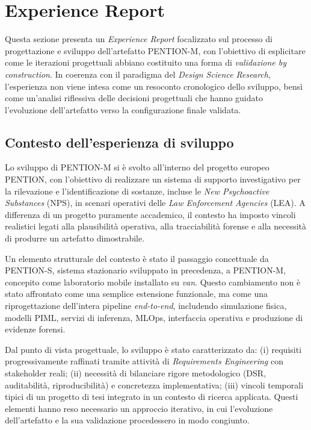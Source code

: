 \section{Experience Report}
\label{sec:experience_report}

Questa sezione presenta un \emph{Experience Report} focalizzato sul processo di progettazione e sviluppo dell’artefatto \textsc{PENTION-M}, con l’obiettivo di esplicitare come le iterazioni progettuali abbiano costituito una forma di \emph{validazione by construction}. In coerenza con il paradigma del \emph{Design Science Research}, l’esperienza non viene intesa come un resoconto cronologico dello sviluppo, bensì come un’analisi riflessiva delle decisioni progettuali che hanno guidato l’evoluzione dell’artefatto verso la configurazione finale validata.

\subsection{Contesto dell’esperienza di sviluppo}
\label{sec:exp_context}

Lo sviluppo di \textsc{PENTION-M} si è svolto all’interno del progetto europeo PENTION, con l’obiettivo di realizzare un sistema di supporto investigativo per la rilevazione e l’identificazione di sostanze, incluse le \emph{New Psychoactive Substances} (NPS), in scenari operativi delle \emph{Law Enforcement Agencies} (LEA).
A differenza di un progetto puramente accademico, il contesto ha imposto vincoli realistici legati alla plausibilità operativa, alla tracciabilità forense e alla necessità di produrre un artefatto dimostrabile.

Un elemento strutturale del contesto è stato il passaggio concettuale da \textsc{PENTION-S}, sistema stazionario sviluppato in precedenza, a \textsc{PENTION-M}, concepito come laboratorio mobile installato su \textit{van}.
Questo cambiamento non è stato affrontato come una semplice estensione funzionale, ma come una riprogettazione dell’intera pipeline \textit{end-to-end}, includendo simulazione fisica, modelli PIML, servizi di inferenza, MLOps, interfaccia operativa e produzione di evidenze forensi.

Dal punto di vista progettuale, lo sviluppo è stato caratterizzato da:
(i) requisiti progressivamente raffinati tramite attività di \emph{Requirements Engineering} con stakeholder reali;
(ii) necessità di bilanciare rigore metodologico (DSR, auditabilità, riproducibilità) e concretezza implementativa;
(iii) vincoli temporali tipici di un progetto di tesi integrato in un contesto di ricerca applicata.
Questi elementi hanno reso necessario un approccio iterativo, in cui l’evoluzione dell’artefatto e la sua validazione procedessero in modo congiunto.

